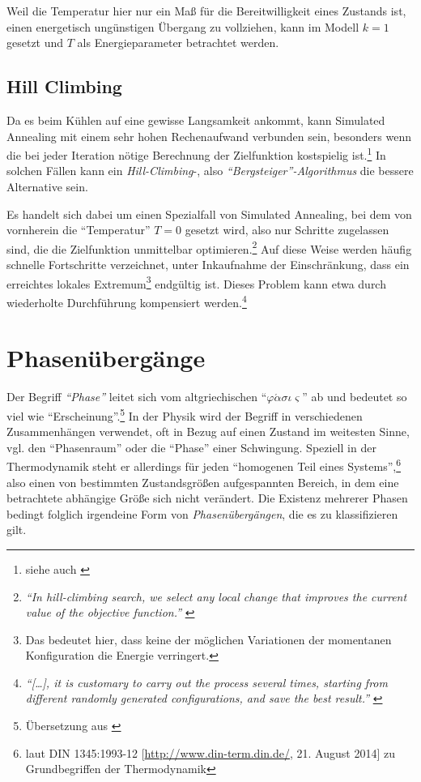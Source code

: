 \documentclass[a4paper, 10pt, twoside, openany]{book} %
\def \phi {\varphi}
\begin{document}
	Weil die Temperatur hier nur ein Maß für die Bereitwilligkeit eines Zustands ist, einen energetisch ungünstigen Übergang zu vollziehen, kann im Modell $k = 1$ gesetzt und $T$ als Energieparameter betrachtet werden.
	
	\subsection{Hill Climbing}
	\label{Hill Climbing}
	
	Da es beim Kühlen auf eine gewisse Langsamkeit ankommt, kann Simulated Annealing mit einem sehr hohen Rechenaufwand verbunden sein, besonders wenn die bei jeder Iteration nötige Berechnung der Zielfunktion kostspielig ist.\footnote{siehe auch \cite[S.~139]{vanLaarhoven}} In solchen Fällen kann ein \emph{Hill-Climbing}-, also \emph{"`Bergsteiger"'-Algorithmus} die bessere Alternative sein.
	
	Es handelt sich dabei um einen Spezialfall von Simulated Annealing, bei dem von vornherein die "`Temperatur"' $T = 0$ gesetzt wird, also nur Schritte zugelassen sind, die die Zielfunktion unmittelbar optimieren.\footnote{\emph{"`In hill-climbing search, we select any local change that improves the current value of the objective function."'} \cite[S.~334]{Selman}} Auf diese Weise werden häufig schnelle Fortschritte verzeichnet, unter Inkaufnahme der Einschränkung, dass ein erreichtes lokales Extremum\footnote{Das bedeutet hier, dass keine der möglichen Variationen der momentanen Konfiguration die Energie verringert.} endgültig ist. Dieses Problem kann etwa durch wiederholte Durchführung kompensiert werden.\footnote{\emph{"`\emph{[\dots]}, it is customary to carry out the process several times, starting from different randomly generated configurations, and save the best result."'} \cite[S.~672]{Kirkpatrick}}
    
	\section{Phasenübergänge}
	
	Der Begriff \emph{"`Phase"'} leitet sich vom altgriechischen "`$\phi \acute \alpha \sigma \iota \varsigma$"' ab und bedeutet so viel wie "`Erscheinung"'.\footnote{Übersetzung aus \cite[S.~778]{Schmidt}} In der Physik wird der Begriff in verschiedenen Zusammenhängen verwendet, oft in Bezug auf einen Zustand im weitesten Sinne, vgl. den "`Phasenraum"' oder die "`Phase"' einer Schwingung. Speziell in der Thermodynamik steht er allerdings für jeden "`homogenen Teil eines Systems"',\footnote{laut DIN 1345:1993-12 [\url{http://www.din-term.din.de/}, 21. August 2014] zu Grundbegriffen der Thermodynamik} also einen von bestimmten Zustandsgrößen aufgespannten Bereich, in dem eine betrachtete abhängige Größe sich nicht verändert. Die Existenz mehrerer Phasen bedingt folglich irgendeine Form von \emph{Phasenübergängen}, die es zu klassifizieren gilt.
	
\end{document}
